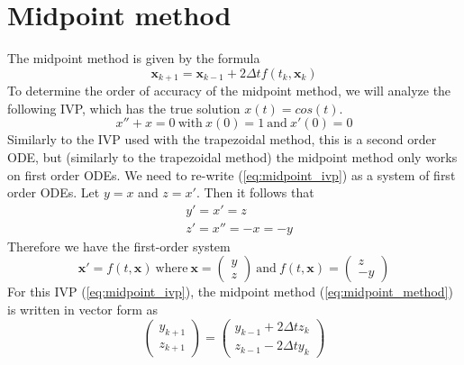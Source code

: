 \documentclass{article}
\begin{document}
\section{Midpoint method}
The midpoint method is given by the formula
\begin{equation} \label{eq:midpoint_method}
\bm{x}_{k+1} = \bm{x}_{k-1} + 2{\Delta t}f(t_k,\bm{x}_k)
\end{equation}
To determine the order of accuracy of the midpoint method, we will analyze the following IVP, which has the true solution \begin{math}
x(t) = cos(t)\end{math}. \begin{equation} \label{eq:midpoint_ivp}
x'' + x = 0\ \textrm{with}\ x(0) = 1\  \textrm{and}\ x'(0) = 0
\end{equation}
Similarly to the IVP used with the trapezoidal method, this is a second order ODE, but (similarly to the trapezoidal method) the midpoint method only works on first order ODEs.  We need to re-write (\ref{eq:midpoint_ivp}) as a system of first order ODEs. Let \(y = x\) and \(z = x'\). Then it follows that
\begin{equation}
\begin{split}
& y' = x' = z \\
& z' = x'' = -x = -y
\end{split}
\end{equation}
Therefore we have the first-order system
\begin{equation}
\bm{x}' = f(t, \bm{x})\ \textrm{where}\ \bm{x} = \begin{pmatrix}y \\ z\end{pmatrix}\ \textrm{and}\ f(t,\bm{x}) = \begin{pmatrix}z \\ -y\end{pmatrix}
\end{equation}
For this IVP (\ref{eq:midpoint_ivp}), the midpoint method (\ref{eq:midpoint_method}) is written in vector form as
\begin{equation} \label{eq:midpoint_method_vector_form}
\begin{pmatrix}y_{k+1} \\ z_{k+1}\end{pmatrix} = \begin{pmatrix}y_{k-1} + 2{\Delta t}z_k \\ z_{k-1} - 2{\Delta t}y_k\end{pmatrix}
\end{equation}
\end{document}
